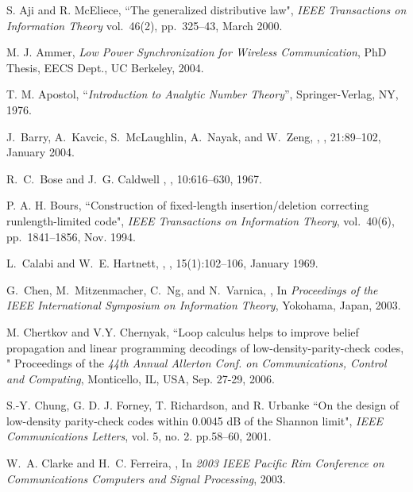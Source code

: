 \begin{thebibliography}{10}
S. Aji and R. McEliece, ``The generalized distributive law",
\emph{IEEE Transactions on Information Theory} vol.\ 46(2),
pp.~325--43, March 2000.

M. J. Ammer, \emph{Low Power Synchronization for Wireless
Communication}, PhD Thesis, EECS Dept., UC Berkeley, 2004.

 T. M. Apostol, ``\emph{Introduction to Analytic Number
Theory}'', Springer-Verlag, NY, 1976.


J.~Barry, A.~Kavcic, S.~McLaughlin, A.~Nayak, and W.~Zeng,
,
, 21:89--102, January 2004.

R.~C.~Bose and J.~G. Caldwell
,
, 10:616--630, 1967.

P. A. H. Bours, ``Construction of fixed-length insertion/deletion
correcting runlength-limited code", \emph{IEEE Transactions on
Information Theory}, vol.\ 40(6), pp.~1841--1856, Nov. 1994.


L.~Calabi and W.~E. Hartnett,
,
, 15(1):102--106, January 1969.

G.~Chen, M.~Mitzenmacher, C.~Ng, and N.~Varnica,
,
\newblock In {\em {Proceedings of the IEEE International Symposium on
  Information Theory}}, Yokohama, Japan, 2003.


 M. Chertkov and V.Y. Chernyak, ``Loop calculus
helps to improve belief propagation and linear programming decodings
of low-density-parity-check codes, " Proceedings of the \emph{44th
Annual Allerton Conf. on Communications, Control and Computing},
Monticello, IL, USA, Sep. 27-29, 2006.

S.-Y. Chung, G. D. J. Forney, T. Richardson, and R. Urbanke ``On the
design of low-density parity-check codes within 0.0045 dB of the
Shannon limit", \emph{IEEE Communications Letters}, vol. 5, no. 2.
pp.58--60, 2001.

W.~A. Clarke and H.~C. Ferreira,
,
\newblock In {\em {2003 IEEE Pacific Rim Conference on Communications Computers
  and Signal Processing}}, 2003.


\end{thebibliography}
